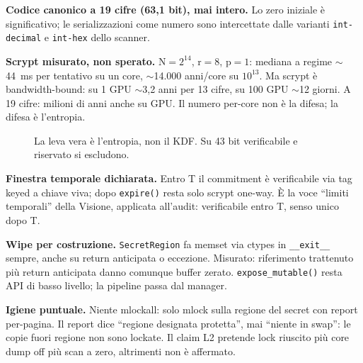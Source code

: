 \documentclass[11pt,a4paper]{article}
\begin{document}
\textbf{Codice canonico a 19 cifre (63,1 bit), mai intero.} Lo zero iniziale \`e
significativo; le serializzazioni come numero sono intercettate dalle varianti
\texttt{int-decimal} e \texttt{int-hex} dello scanner.

\textbf{Scrypt misurato, non sperato.} N$=2^{14}$, r$=8$, p$=1$: mediana a regime
$\sim$44~ms per tentativo su un core, $\sim$14.000 anni/core su $10^{13}$.
Ma scrypt \`e bandwidth-bound: su 1 GPU $\sim$3,2 anni per 13 cifre, su 100 GPU
$\sim$12 giorni. A 19 cifre: milioni di anni anche su GPU. Il numero per-core non
\`e la difesa; la difesa \`e l'entropia.

\begin{figure}[h]
\centering
{}
\caption{La leva vera \`e l'entropia, non il KDF. Su 43 bit verificabile e riservato si escludono.}
\end{figure}

\textbf{Finestra temporale dichiarata.} Entro T il commitment \`e verificabile via tag
keyed a chiave viva; dopo \texttt{expire()} resta solo scrypt one-way. \`E la voce
``limiti temporali'' della Visione, applicata all'audit: verificabile entro T,
senso unico dopo T.

\textbf{Wipe per costruzione.} \texttt{SecretRegion} fa memset via ctypes in
\texttt{\_\_exit\_\_} sempre, anche su return anticipata o eccezione. Misurato:
riferimento trattenuto pi\`u return anticipata danno comunque buffer zerato.
\texttt{expose\_mutable()} resta API di basso livello; la pipeline passa dal manager.

\textbf{Igiene puntuale.} Niente mlockall: solo mlock sulla regione del secret con
report per-pagina. Il report dice ``regione designata protetta'', mai ``niente in
swap'': le copie fuori regione non sono lockate. Il claim L2 pretende lock riuscito
pi\`u core dump off pi\`u scan a zero, altrimenti non \`e affermato.
\end{document}
